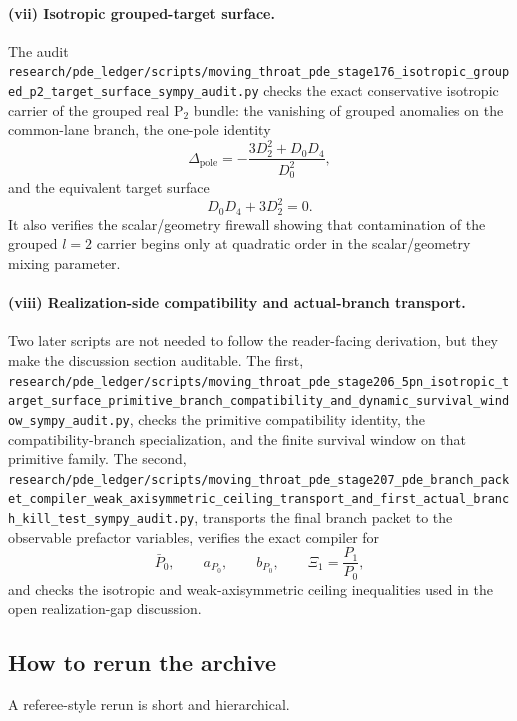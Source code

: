 \documentclass[11pt]{article}
\theoremstyle{definition}
\newcommand{\Ptwo}{\ensuremath{\mathrm{P}_2}}
\newcommand{\XiOne}{\ensuremath{\Xi_1}}
\begin{document}
\paragraph{(vii) Isotropic grouped-target surface.}
The audit
\nolinkurl{research/pde_ledger/scripts/moving_throat_pde_stage176_isotropic_grouped_p2_target_surface_sympy_audit.py}
checks the exact conservative isotropic carrier of the grouped real $\Ptwo$ bundle: the vanishing of grouped anomalies on the common-lane branch, the one-pole identity
\[
 \Delta_{\mathrm{pole}}=-\frac{3D_2^2+D_0D_4}{D_0^2},
\]
and the equivalent target surface
\[
 D_0D_4+3D_2^2=0.
\]
It also verifies the scalar/geometry firewall showing that contamination of the grouped $l=2$ carrier begins only at quadratic order in the scalar/geometry mixing parameter.

\paragraph{(viii) Realization-side compatibility and actual-branch transport.}
Two later scripts are not needed to follow the reader-facing derivation, but they make the discussion section auditable. The first,
\nolinkurl{research/pde_ledger/scripts/moving_throat_pde_stage206_5pn_isotropic_target_surface_primitive_branch_compatibility_and_dynamic_survival_window_sympy_audit.py},
checks the primitive compatibility identity, the compatibility-branch specialization, and the finite survival window on that primitive family. The second,
\nolinkurl{research/pde_ledger/scripts/moving_throat_pde_stage207_pde_branch_packet_compiler_weak_axisymmetric_ceiling_transport_and_first_actual_branch_kill_test_sympy_audit.py},
transports the final branch packet to the observable prefactor variables, verifies the exact compiler for
\[
 \bar P_0,
 \qquad
 a_{P_0},
 \qquad
 b_{P_0},
 \qquad
 \XiOne=\frac{P_1}{P_0},
\]
and checks the isotropic and weak-axisymmetric ceiling inequalities used in the open realization-gap discussion.

\subsection{How to rerun the archive}

A referee-style rerun is short and hierarchical.
\end{document}
